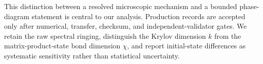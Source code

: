 This distinction between a resolved microscopic mechanism and a bounded phase-diagram statement is central to our analysis.
Production records are accepted only after numerical, transfer, checksum, and independent-validator gates.
We retain the raw spectral ringing, distinguish the Krylov dimension $k$ from the matrix-product-state bond dimension $\chi$, and report initial-state differences as systematic sensitivity rather than statistical uncertainty.

